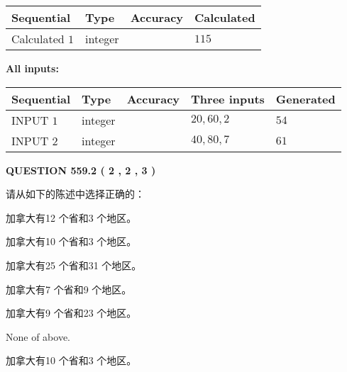 \documentclass{ctexart}
\begin{document}
  
\noindent\begin{tabular}{|l|l|l|l|}
\hline
 Sequential & Type & Accuracy & Calculated \\ 
\hline
 
 
  Calculated $  1 $ & integer &  & 
  $ 115 $ 
 \\  \hline  
 \end{tabular}
   
   
   
   
\noindent\vspace{0.1in}\hspace{-0.08in} {\textbf{\Large{All inputs: }}}
   
   
  
  
\noindent\begin{tabular}{|l|l|l|l|l|}
\hline
 Sequential & Type & Accuracy & Three inputs & Generated \\ 
\hline
 
 
  INPUT $  1 $ & integer &  & $
 20
 , 
 60
 , 
 2
 $ & $ 54 $ 
 \\  \hline  
 
 
  INPUT $  2 $ & integer &  & $
 40
 , 
 80
 , 
 7
 $ & $ 61 $ 
 \\  \hline  
 \end{tabular}
   
   
  
\vspace{0.2in}
  
{\textbf{\Large{QUESTION
559.2 
 ( 2 , 2 , 3 )
}}}
  
  
请从如下的陈述中选择正确的：
 
 
加拿大有12 个省和3 个地区。
 
 
加拿大有10 个省和3 个地区。
 
 
加拿大有25 个省和31 个地区。
 
 
加拿大有7 个省和9 个地区。
 
 
加拿大有9 个省和23 个地区。
 
 
 None of above.
 
 
\noindent{}
 
 
加拿大有10 个省和3 个地区。
 
 
\noindent{}
 
\end{document}
